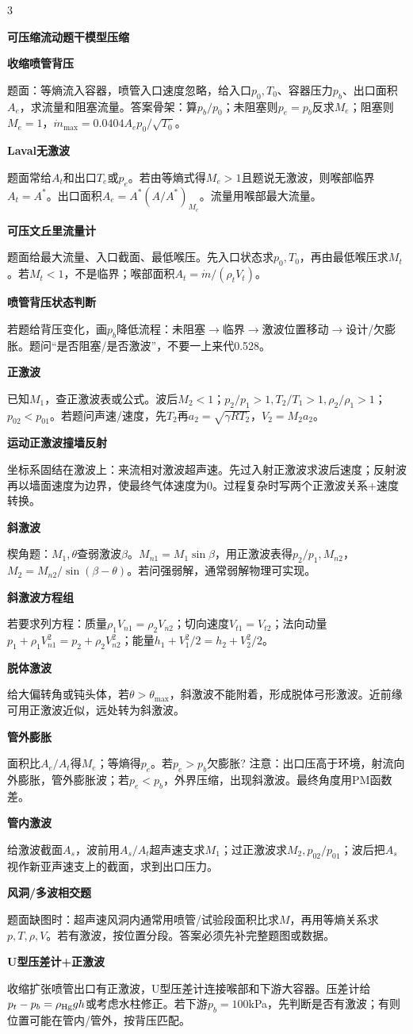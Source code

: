\documentclass[a4paper]{article}
\newcommand{\qt}[1]{\vspace{0.25pt}\colorbox{Q}{\parbox{\dimexpr\linewidth-2\fboxsep}{\color{white}\bfseries #1}}\par}
\newcommand{\sect}[1]{\qt{#1}}
\begin{document}
\begin{multicols}{3}
{\sect{可压缩流动题干模型压缩}
\sect{收缩喷管背压}
题面：等熵流入容器，喷管入口速度忽略，给入口$p_0,T_0$、容器压力$p_b$、出口面积$A_e$，求流量和阻塞流量。答案骨架：算$p_b/p_0$；未阻塞则$p_e=p_b$反求$M_e$；阻塞则$M_e=1$，$\dot m_{\max}=0.0404A_ep_0/\sqrt{T_0}$。
\sect{Laval无激波}
题面常给$A_t$和出口$T_e$或$p_e$。若由等熵式得$M_e>1$且题说无激波，则喉部临界$A_t=A^*$。出口面积$A_e=A^*(A/A^*)_{M_e}$。流量用喉部最大流量。
\sect{可压文丘里流量计}
题面给最大流量、入口截面、最低喉压。先入口状态求$p_0,T_0$，再由最低喉压求$M_t$。若$M_t<1$，不是临界；喉部面积$A_t=\dot m/(\rho_tV_t)$。
\sect{喷管背压状态判断}
若题给背压变化，画$p_b$降低流程：未阻塞$\to$临界$\to$激波位置移动$\to$设计/欠膨胀。题问“是否阻塞/是否激波”，不要一上来代0.528。
\sect{正激波}
已知$M_1$，查正激波表或公式。波后$M_2<1$；$p_2/p_1>1,T_2/T_1>1,\rho_2/\rho_1>1$；$p_{02}<p_{01}$。若题问声速/速度，先$T_2$再$a_2=\sqrt{\gamma RT_2}$，$V_2=M_2a_2$。
\sect{运动正激波撞墙反射}
坐标系固结在激波上：来流相对激波超声速。先过入射正激波求波后速度；反射波再以墙面速度为边界，使最终气体速度为0。过程复杂时写两个正激波关系+速度转换。
\sect{斜激波}
楔角题：$M_1,\theta$查弱激波$\beta$。$M_{n1}=M_1\sin\beta$，用正激波表得$p_2/p_1,M_{n2}$，$M_2=M_{n2}/\sin(\beta-\theta)$。若问强弱解，通常弱解物理可实现。
\sect{斜激波方程组}
若要求列方程：质量$\rho_1V_{n1}=\rho_2V_{n2}$；切向速度$V_{t1}=V_{t2}$；法向动量$p_1+\rho_1V_{n1}^2=p_2+\rho_2V_{n2}^2$；能量$h_1+V_1^2/2=h_2+V_2^2/2$。
\sect{脱体激波}
给大偏转角或钝头体，若$\theta>\theta_{\max}$，斜激波不能附着，形成脱体弓形激波。近前缘可用正激波近似，远处转为斜激波。
\sect{管外膨胀}
面积比$A_e/A_t$得$M_e$；等熵得$p_e$。若$p_e>p_b$欠膨胀? 注意：出口压高于环境，射流向外膨胀，管外膨胀波；若$p_e<p_b$，外界压缩，出现斜激波。最终角度用PM函数差。
\sect{管内激波}
给激波截面$A_s$，波前用$A_s/A_t$超声速支求$M_1$；过正激波求$M_2,p_{02}/p_{01}$；波后把$A_s$视作新亚声速支上的截面，求到出口压力。
\sect{风洞/多波相交题}
题面缺图时：超声速风洞内通常用喷管/试验段面积比求$M$，再用等熵关系求$p,T,\rho,V$。若有激波，按位置分段。答案必须先补完整题图或数据。
\sect{U型压差计+正激波}
收缩扩张喷管出口有正激波，U型压差计连接喉部和下游大容器。压差计给$p_t-p_b=\rho_{\rm Hg}gh$或考虑水柱修正。若下游$p_b=100$kPa，先判断是否有激波；有则位置可能在管内/管外，按背压匹配。

}
\end{multicols}
\end{document}
